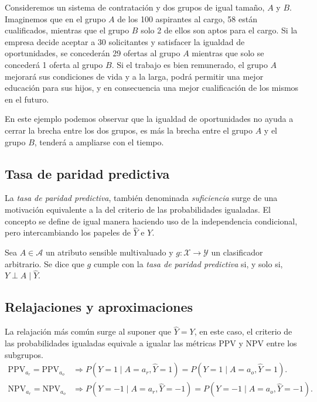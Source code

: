\documentclass[oneside,openright,titlepage,numbers=noenddot,openany,headinclude,footinclude=true,
cleardoublepage=empty,abstractoff,BCOR=5mm,paper=a4,fontsize=12pt,main=spanish]{scrreprt}
\begin{document}
\begin{example}
Consideremos un sistema de contratación y dos grupos de igual tamaño, $A$ y $B$. Imaginemos que en el grupo $A$ de los 100 aspirantes al cargo, 58 están cualificados, mientras que el grupo $B$ solo 2 de ellos son aptos para el cargo. Si la empresa decide aceptar a 30 solicitantes y satisfacer la igualdad de oportunidades, se concederán 29 ofertas al grupo $A$ mientras que solo se concederá 1 oferta al grupo $B$. Si el trabajo es bien remunerado, el grupo $A$ mejorará sus condiciones de vida y a la larga, podrá permitir una mejor educación para sus hijos, y en consecuencia una mejor cualificación de los mismos en el futuro. 

En este ejemplo podemos observar que la igualdad de oportunidades no ayuda a cerrar la brecha entre los dos grupos, es más la brecha entre el grupo $A$ y el grupo $B$, tenderá a ampliarse con el tiempo. 
\end{example}

\subsection{Tasa de paridad predictiva} \label{subsec:suficiencia}

La \textit{tasa de paridad predictiva}, también denominada \textit{suficiencia} surge de una motivación equivalente a la del criterio de las probabilidades igualadas. El concepto se define de igual manera haciendo uso de la independencia condicional, pero intercambiando los papeles de $\hat{Y}$ e $Y$. \\

\begin{definition}
Sea $A \in \mathcal{A}$ un atributo sensible multivaluado y $g\colon \mathcal{X} \to \mathcal{Y}$ un clasificador arbitrario. Se dice que $g$ cumple con la \textit{tasa de paridad predictiva} si, y solo si, $Y \perp A \mid \hat{Y}$.
\end{definition}

\subsection*{Relajaciones y aproximaciones}

La relajación más común surge al suponer que $\hat{Y}=Y$, en este caso, el criterio de las probabilidades igualadas equivale a igualar las métricas PPV y NPV entre los subgrupos. 
\begin{equation*}
\begin{split}
\text{PPV}_{a_r}=\text{PPV}_{a_o} &\Rightarrow P(Y=1 \mid A=a_r, \hat{Y}=1)=P(Y=1 \mid A=a_o, \hat{Y}=1).\\
\text{NPV}_{a_r}=\text{NPV}_{a_o} &\Rightarrow P(Y=-1 \mid A=a_r,\hat{Y}=-1)=P(Y=-1 \mid A=a_o,\hat{Y}=-1).
\end{split}
\end{equation*}
\end{document}
